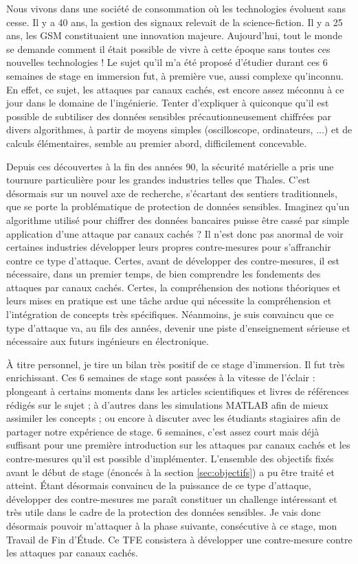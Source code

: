 \documentclass[oneside]{book}
\begin{document}
Nous vivons dans une société de consommation où les technologies évoluent sans cesse. Il y a 40 ans, la gestion des signaux relevait de la science-fiction. Il y a 25 ans, les GSM constituaient une innovation majeure. Aujourd’hui, tout le monde se demande comment il était possible de vivre à cette époque sans toutes ces nouvelles technologies ! Le sujet qu'il m'a été proposé d'étudier durant ces 6 semaines de stage en immersion fut, à première vue, aussi complexe qu'inconnu. En effet, ce sujet, les attaques par canaux cachés, est encore assez méconnu à ce jour dans le domaine de l'ingénierie. Tenter d'expliquer à quiconque qu'il est possible de subtiliser des données sensibles précautionneusement chiffrées par divers algorithmes, à partir de moyens simples (oscilloscope, ordinateurs, ...) et de calculs élémentaires, semble au premier abord, difficilement concevable. 

Depuis ces découvertes à la fin des années 90, la sécurité matérielle a pris une tournure particulière pour les grandes industries telles que Thales. C'est désormais sur un nouvel axe de recherche, s'écartant des sentiers traditionnels, que se porte la problématique de protection de données sensibles. Imaginez qu'un algorithme utilisé pour chiffrer des données bancaires puisse être cassé par simple application d'une attaque par canaux cachés ? Il n'est donc pas anormal de voir certaines industries développer leurs propres contre-mesures pour s'affranchir contre ce type d'attaque. Certes, avant de développer des contre-mesures, il est nécessaire, dans un premier temps, de bien comprendre les fondements des attaques par canaux cachés. Certes, la compréhension des notions théoriques et leurs mises en pratique est une tâche ardue qui nécessite la compréhension et l'intégration de concepts très spécifiques. Néanmoins, je suis convaincu que ce type d'attaque va, au fils des années, devenir une piste d'enseignement sérieuse et nécessaire aux futurs ingénieurs en électronique.

À titre personnel, je tire un bilan très positif de ce stage d'immersion. Il fut très enrichissant. Ces 6 semaines de stage sont passées à la vitesse de l'éclair : plongeant à certains moments dans les articles scientifiques et livres de références rédigés sur le sujet ; à d'autres dans les simulations MATLAB afin de mieux assimiler les concepts ; ou encore à discuter avec les étudiants stagiaires afin de partager notre expérience de stage. 6 semaines, c'est assez court mais déjà suffisant pour une première introduction sur les attaques par canaux cachés et les contre-mesures qu'il est possible d'implémenter. L'ensemble des objectifs fixés avant le début de stage (énoncés à la section \ref{sec:objectifs}) a pu être traité et atteint. Étant désormais convaincu de la puissance de ce type d'attaque, développer des contre-mesures me paraît constituer un challenge intéressant et très utile dans le cadre de la protection des données sensibles. Je vais donc désormais pouvoir m'attaquer à la phase suivante, consécutive à ce stage, mon Travail de Fin d'Étude. Ce TFE consistera à développer une contre-mesure contre les attaques par canaux cachés.
\end{document}
